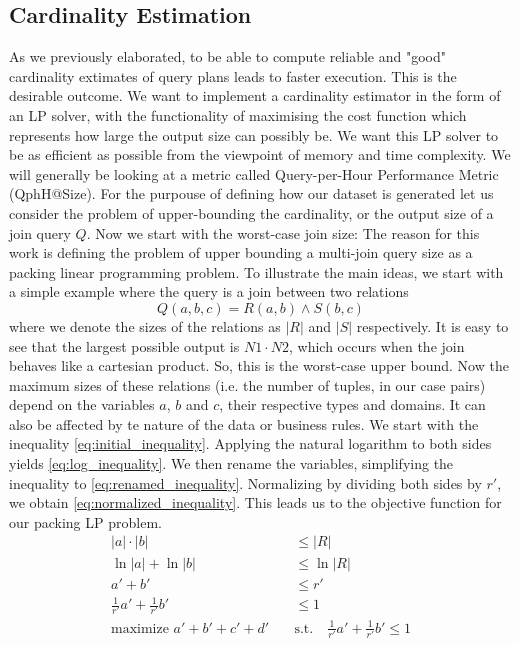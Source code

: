 \subsection{Cardinality Estimation}
As we previously elaborated,  to be able to compute reliable and
"good" cardinality extimates of query plans leads to faster execution. 
This is the desirable outcome.
We want to implement a cardinality estimator in the form of an LP solver, with the
functionality of maximising the cost function which represents how large the output size
can possibly be. We want this LP solver to be as efficient as possible from the
viewpoint of memory and time complexity. We will generally be looking at 
a metric called Query-per-Hour Performance Metric (QphH@Size).
For the purpouse of defining how our dataset is generated let us consider the 
problem of upper-bounding the cardinality, or the output size of a join query $Q$.
Now we start with the worst-case join size:
The reason for this work is  
defining the problem of upper bounding a multi-join query size as a packing linear 
programming problem.
To illustrate the main ideas, we start with a simple example where the query is a join
between two relations
\[
Q(a, b, c) = R(a, b) \land S(b, c)
\]
where we denote the sizes of the relations as
$|R|$ and $|S|$ respectively.
It is easy to see that the largest possible output is $N1 \cdot N2$, which occurs when the join
behaves like a cartesian product. So, this is the worst-case
upper bound.
Now the maximum sizes of these relations (i.e. the number of tuples, in our case pairs) depend on the
variables $a$, $b$ and $c$, their respective types and domains. It can also
be affected by te nature of the data or business rules.
We start with the inequality \ref{eq:initial_inequality}. Applying the natural logarithm to both sides yields \ref{eq:log_inequality}. We then rename the variables, simplifying the inequality to \ref{eq:renamed_inequality}. 
Normalizing by dividing both sides by \(r'\), we obtain \ref{eq:normalized_inequality}. This leads us to the objective function for our packing LP problem.
\begin{align}
    |a| \cdot |b| &\leq |R| \label{eq:initial_inequality} \\
    \ln|a| + \ln|b| &\leq \ln|R| \label{eq:log_inequality} \\
    a' + b' &\leq r' \label{eq:renamed_inequality} \\
    \frac{1}{r'} a' + \frac{1}{r'} b' &\leq 1 \label{eq:normalized_inequality} \\
    \text{maximize } a' + b' + c' + d' \quad &\text{s.t.} \quad \frac{1}{r'} a' + \frac{1}{r'} b' \leq 1 \label{eq:objective_function}
    \end{align}

